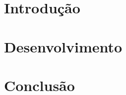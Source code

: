 \documentclass[12pt, oneside]{book}
\begin{document}
\frontmatter



\maketitle

\tableofcontents

\listoffigures

\mainmatter

\chapter{Introdução}


\chapter{Desenvolvimento}


\chapter{Conclusão}


\backmatter

\printbibliography[heading=bibintoc]
\nocite{*}
\end{document}
